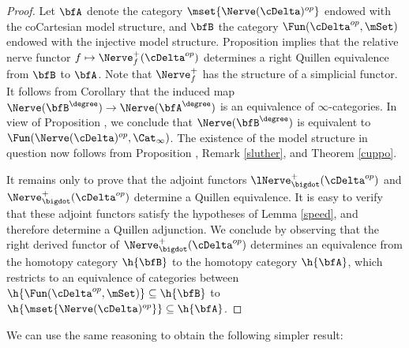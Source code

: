 \begin{proof}
Let $\bfA$ denote the category $\mset{ \Nerve(\cDelta)^{op} }$ endowed with the
coCartesian model structure, and $\bfB$ the category $\Fun( \cDelta^{op}, \mSet)$ endowed
with the injective model structure. Proposition  implies that
the relative nerve functor $f \mapsto \Nerve_{f}^{+}( \cDelta^{op} )$ determines a right
Quillen equivalence from $\bfB$ to $\bfA$. Note that $\Nerve^{+}_{f}$ has the structure of a simplicial functor. It follows from Corollary  that the induced map
$\Nerve( \bfB^{\degree} ) \rightarrow \Nerve( \bfA^{\degree} )$ is an equivalence of
$\infty$-categories. In view of Proposition , we conclude that
$\Nerve( \bfB^{\degree} )$ is equivalent to $\Fun( \Nerve(\cDelta)^{op}, \Cat_{\infty} )$. 
The existence of the model structure in question now follows from
Proposition , Remark \ref{sluther}, and Theorem \ref{cuppo}. 

It remains only to prove that the adjoint functors 
$\lNerve^{+}_{\bigdot}( \cDelta^{op})$ and $\Nerve^{+}_{\bigdot}( \cDelta^{op})$ determine
a Quillen equivalence. It is easy to verify that these adjoint functors satisfy the hypotheses of Lemma \ref{speed}, and therefore determine a Quillen adjunction. We conclude by observing that the right derived functor of $\Nerve^{+}_{\bigdot}( \cDelta^{op} )$ determines an equivalence from the homotopy
category $\h{\bfB}$ to the homotopy category $\h{\bfA}$, which restricts to an equivalence
of categories between $\h{ \Fun( \cDelta^{op}, \mSet)} \subseteq \h{\bfB}$ to
$\h{ \mset{ \Nerve(\cDelta)^{op} }} \subseteq \h{\bfA}$. 
\end{proof}

We can use the same reasoning to obtain the following simpler result:


